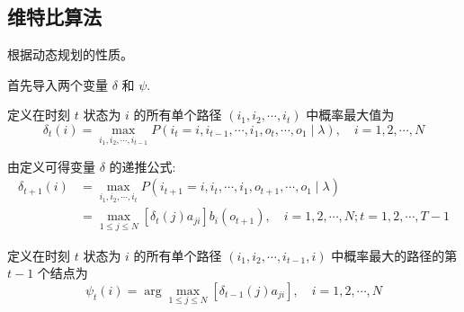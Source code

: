 \subsection{维特比算法}

根据动态规划的性质。

首先导入两个变量 $ \delta $ 和 $ \psi $. 

\begin{definition}
    定义在时刻 $ t $ 状态为 $ i $ 的所有单个路径 $ \left(i_{1}, i_{2}, \cdots, i_{t}\right) $ 中概率最大值为
$$
\delta_{t}(i)=\max _{i_1, i_{2}, \cdots, i_{t-1}} P\left(i_{t}=i, i_{t-1}, \cdots, i_{1}, o_{t}, \cdots, o_{1} \mid \lambda\right), \quad i=1,2, \cdots, N
$$
\end{definition}

\begin{corollary}
   由定义可得变量 $ \delta $ 的递推公式:
$$
\begin{aligned}
\delta_{t+1}(i) &=\max _{i_1, i_2, \cdots, i_{t}} P\left(i_{t+1}=i, i_{t}, \cdots, i_{1}, o_{t+1}, \cdots, o_{1} \mid \lambda\right) \\
&=\max _{1 \leqslant j \leqslant N}\left[\delta_{t}(j) a_{j i}\right] b_{i}\left(o_{t+1}\right), \quad i=1,2, \cdots, N ; t=1,2, \cdots, T-1
\end{aligned}
$$ 
\end{corollary}

\begin{definition}
    定义在时刻 $ t $ 状态为 $ i $ 的所有单个路径 $ \left(i_{1}, i_{2}, \cdots, i_{t-1}, i\right) $ 中概率最大的路径的第 $ t-1 $ 个结点为
$$
\psi_{t}(i)=\arg \max _{1 \leqslant j \leqslant N}\left[\delta_{t-1}(j) a_{j i}\right], \quad i=1,2, \cdots, N
$$
\end{definition}




